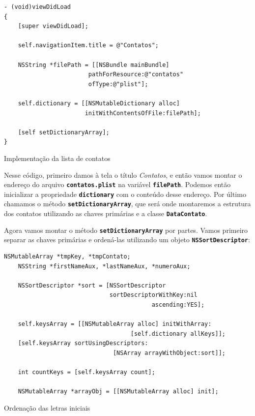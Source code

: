 \documentclass[a4paper,12pt,brazil,oneside]{book}
\begin{document}
\begin{listing}[H]
\begin{verbatim}
- (void)viewDidLoad
{
    [super viewDidLoad];
    
    self.navigationItem.title = @"Contatos";
    
    NSString *filePath = [[NSBundle mainBundle]
    					pathForResource:@"contatos"
    					ofType:@"plist"];
    
    self.dictionary = [[NSMutableDictionary alloc]
    				   initWithContentsOfFile:filePath];
    
    [self setDictionaryArray];
}
\end{verbatim}
\caption{Implementação da lista de contatos}
\end{listing}


Nesse código, primeiro damos à tela o título \emph{Contatos}, e então vamos montar o endereço do arquivo \texttt{\textbf{contatos.plist}} na variável \texttt{\textbf{filePath}}. Podemos então inicializar a propriedade \texttt{\textbf{dictionary}} com o conteúdo desse endereço. Por último chamamos o método \texttt{\textbf{setDictionaryArray}}, que será onde montaremos a estrutura dos contatos utilizando as chaves primárias e a classe \texttt{\textbf{DataContato}}.

Agora vamos montar o método \texttt{\textbf{setDictionaryArray}} por partes. Vamos primeiro separar as chaves primárias e ordená-las utilizando um objeto \texttt{\textbf{NSSortDescriptor}}:

\begin{listing}[H]
\begin{verbatim}
NSMutableArray *tmpKey, *tmpContato;
    NSString *firstNameAux, *lastNameAux, *numeroAux;
    
    NSSortDescriptor *sort = [NSSortDescriptor
                              sortDescriptorWithKey:nil
                                          ascending:YES];
    
    self.keysArray = [[NSMutableArray alloc] initWithArray:
                                    [self.dictionary allKeys]];
    [self.keysArray sortUsingDescriptors:
                               [NSArray arrayWithObject:sort]];
    
    int countKeys = [self.keysArray count];

    NSMutableArray *arrayObj = [[NSMutableArray alloc] init];
\end{verbatim}
\caption{Ordenação das letras iniciais}
\end{listing}
\end{document}
